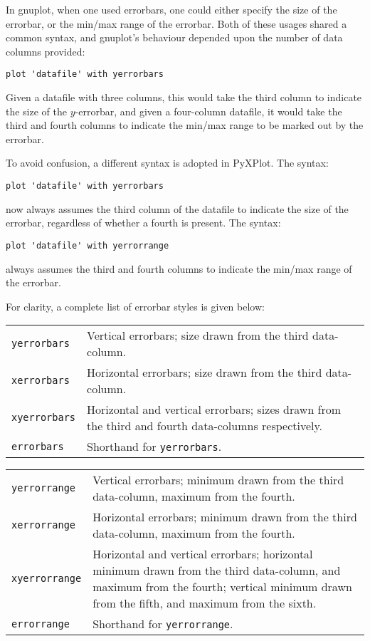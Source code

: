 \label{errorbars}
In gnuplot, when one used
errorbars, one could either specify the size of the errorbar, or the min/max
range of the errorbar. Both of these usages shared a common syntax, and
gnuplot's behaviour depended upon the number of data columns provided:

\begin{verbatim}
plot 'datafile' with yerrorbars
\end{verbatim}

\noindent Given a datafile with three columns, this would take the third column
to indicate the size of the $y$-errorbar, and given a four-column datafile, it
would take the third and fourth columns to indicate the min/max range to be
marked out by the errorbar.

To avoid confusion, a different syntax is adopted in PyXPlot. The syntax:

\begin{verbatim}
plot 'datafile' with yerrorbars
\end{verbatim}

\noindent now always assumes the third column of the datafile to indicate the
size of the errorbar, regardless of whether a fourth is present. The syntax:

\begin{verbatim}
plot 'datafile' with yerrorrange
\end{verbatim}

\noindent always assumes the third and fourth columns to indicate the min/max
range of the errorbar.

\vspace{0.5cm}
For clarity, a complete list of errorbar styles is given below:

\begin{tabular}{p{2.5cm}p{5.5cm}}
\texttt{yerrorbars} & Vertical errorbars; size drawn from the third data-column. \\
\texttt{xerrorbars} & Horizontal errorbars; size drawn from the third data-column. \\
\texttt{xyerrorbars} & Horizontal and vertical errorbars; sizes drawn from the third and fourth data-columns respectively.\\
\texttt{errorbars} & Shorthand for \texttt{yerrorbars}. \\
\end{tabular}

\begin{tabular}{p{2.5cm}p{5.5cm}}
\texttt{yerrorrange} & Vertical errorbars; minimum drawn from the third data-column, maximum from the fourth.\\
\texttt{xerrorrange} & Horizontal errorbars; minimum drawn from the third data-column, maximum from the fourth.\\
\texttt{xyerrorrange} & Horizontal and vertical errorbars; horizontal minimum drawn from the third data-column, and maximum from the fourth; vertical minimum drawn from the fifth, and maximum from the sixth.\\
\texttt{errorrange} & Shorthand for \texttt{yerrorrange}. \\
\end{tabular}

